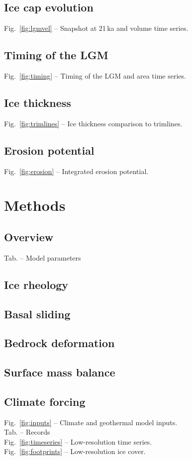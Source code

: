 \documentclass{article}
\begin{document}
\subsection{Ice cap evolution}
    Fig.~\ref{fig:lgmvel} -- Snapshot at 21\,ka and volume time series.
\subsection{Timing of the LGM}
    Fig.~\ref{fig:timing} -- Timing of the LGM and area time series.
\subsection{Ice thickness}
    Fig.~\ref{fig:trimlines} -- Ice thickness comparison to trimlines.
\subsection{Erosion potential}
    Fig.~\ref{fig:erosion} -- Integrated erosion potential.

\section{Methods}
\subsection{Overview}
    Tab. -- Model parameters
\subsection{Ice rheology}
\subsection{Basal sliding}
\subsection{Bedrock deformation}
\subsection{Surface mass balance}
\subsection{Climate forcing}
    Fig.~\ref{fig:inputs} -- Climate and geothermal model inputs.\\
    Tab. -- Records\\
    Fig.~\ref{fig:timeseries} -- Low-resolution time series.\\
    Fig.~\ref{fig:footprints} -- Low-resolution ice cover.
\end{document}
